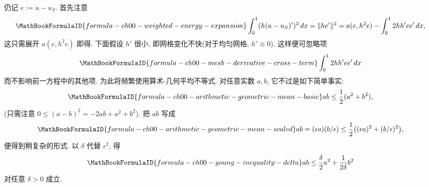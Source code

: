仍记 $e:=u-u_S$. 首先注意
\[
\MathBookFormulaID{formula-ch00-weighted-energy-expansion}
\int_0^1(h(u-u_S)')^2\,dx
=\|he'\|^2
=a(e,h^2e)-\int_0^12hh'ee'\,dx,
\]
这只需展开 $a(e,h^2e)$ 即得. 下面假设 $h'$ 很小, 即网格变化不快(对于均匀网格, $h'\equiv0$). 这样便可忽略项
\[
\MathBookFormulaID{formula-ch00-mesh-derivative-cross-term}
\int_0^12hh'ee'\,dx
\]
而不影响前一方程中的其他项. 为此将频繁使用算术-几何平均不等式. 对任意实数 $a,b$, 它不过是如下简单事实:
\[
\MathBookFormulaID{formula-ch00-arithmetic-geometric-mean-basic}
ab\leq\frac12(a^2+b^2),
\]
(只需注意 $0\leq(a-b)^2=-2ab+a^2+b^2$). 把 $ab$ 写成
\[
\MathBookFormulaID{formula-ch00-arithmetic-geometric-mean-scaled}
ab=(\epsilon a)(b/\epsilon)
\leq\frac12\bigl((\epsilon a)^2+(b/\epsilon)^2\bigr),
\]
便得到稍复杂的形式. 以 $\delta$ 代替 $\epsilon^2$, 得
\begin{equation}
\MathBookFormulaID{formula-ch00-young-inequality-delta}
ab\leq\frac\delta2a^2+\frac1{2\delta}b^2
\label{eq:ch00-young-inequality-delta}
\end{equation}
对任意 $\delta>0$ 成立.

